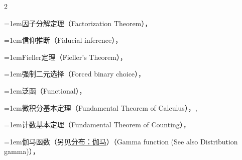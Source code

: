 \begin{multicols}{2}
\par\addvspace{2pt}
\par\noindent\hangindent=1em\hspace*{0em}\label{idx:443}因子分解定理（Factorization Theorem），\hyperref[thm:6.2.6]{\pageref*{thm:6.2.6}}\par
\par\addvspace{2pt}
\par\noindent\hangindent=1em\hspace*{0em}\label{idx:444}信仰推断（Fiducial inference），\hyperref[idxocc:444:268]{\pageref*{idxocc:444:268}}\par
\par\addvspace{2pt}
\par\noindent\hangindent=1em\hspace*{0em}\label{idx:445}Fieller定理（Fieller’s Theorem），\hyperref[sec:9.5.3]{\pageref*{sec:9.5.3}}\par
\par\addvspace{2pt}
\par\noindent\hangindent=1em\hspace*{0em}\label{idx:446}强制二元选择（Forced binary choice），\hyperref[exercise:4.37]{\pageref*{exercise:4.37}}\par
\par\addvspace{2pt}
\par\noindent\hangindent=1em\hspace*{0em}\label{idx:447}泛函（Functional），\hyperref[idxocc:447:449]{\pageref*{idxocc:447:449}}\par
\par\addvspace{2pt}
\par\noindent\hangindent=1em\hspace*{0em}\label{idx:448}微积分基本定理（Fundamental Theorem of Calculus），\hyperref[eq:1.6.2]{\pageref*{eq:1.6.2}}, \hyperref[eq:4.1.3]{\pageref*{eq:4.1.3}}\par
\par\addvspace{2pt}
\par\noindent\hangindent=1em\hspace*{0em}\label{idx:449}计数基本定理（Fundamental Theorem of Counting），\hyperref[thm:1.2.14]{\pageref*{thm:1.2.14}}\par
\par\addvspace{2pt}
\par\noindent\hangindent=1em\hspace*{0em}\label{idx:450}伽马函数（另见\hyperref[idx:306]{分布：伽马}）（Gamma function (See also Distribution gamma)），\hyperref[eq:3.3.2]{\pageref*{eq:3.3.2}}\par

\end{multicols}
